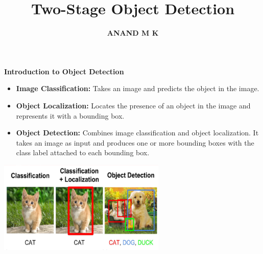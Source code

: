 \documentclass{beamer}
\title{\textbf{Two-Stage Object Detection}}
\author{\textbf{ANAND M K}}
\date{}
\begin{document}
\begin{frame}
    \titlepage
\end{frame}

\begin{frame}{\textbf{Introduction to Object Detection}}
   \begin{itemize}
    \item \textbf{Image Classification:} 
      Takes an image and predicts the object in the image.
    \item \textbf{Object Localization:} 
      Locates the presence of an object in the image and represents it with a bounding box.
    \item \textbf{Object Detection:} 
      Combines image classification and object localization. It takes an image as input and produces one or more bounding boxes with the class label attached to each bounding box.
  \end{itemize}
  \vfill
  \begin{center}
      \includegraphics[width=0.6\textwidth]{Picture1.png}
  \end{center}
\end{frame}
\end{document}
